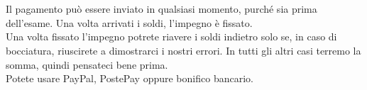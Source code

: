 \section*{\scalebox{1.5}{ESAMI}}
Il pagamento può essere inviato in qualsiasi momento, purché sia prima dell'esame. Una volta arrivati i soldi, l'impegno è fissato.\\
Una volta fissato l'impegno potrete riavere i soldi indietro solo se, in caso di bocciatura, riuscirete a dimostrarci i nostri errori. In tutti gli altri casi terremo la somma, quindi pensateci bene prima.\\
Potete usare PayPal, PostePay oppure bonifico bancario.